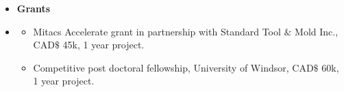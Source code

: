 
\begin {itemize} \item [] {\bf \Large   Grants }  \vspace{-1.5em}
\item []  {\bf \hrulefill } \mdseries \normalsize 
    \begin {itemize}
        \item [$\bullet$]  { \normalsize Mitacs Accelerate grant in partnership with Standard Tool $\&$ Mold Inc., CAD$\$$ 45k, 1 year project.} 
        \item [$\bullet$]  { \normalsize Competitive post doctoral fellowship, University of Windsor, CAD$\$$ 60k, 1 year project.} 
    \end {itemize}
\end {itemize}















